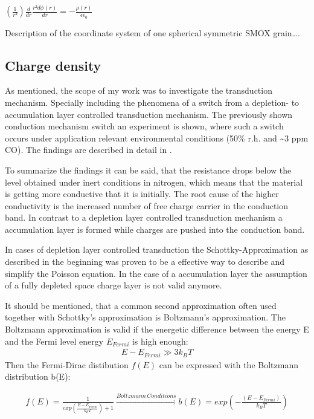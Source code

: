\documentclass[11pt]{article}
\begin{document}
\((\frac{1}{r²})\frac{d}{dr}\frac{r²d\phi(r)}{dr}=-\frac{\rho(r)}{\epsilon\epsilon_{0}}\)

Description of the coordinate system of one spherical symmetric SMOX
grain\ldots.

    \hypertarget{charge-density}{%
\subsection{Charge density}\label{charge-density}}

As mentioned, the scope of my work was to investigate the transduction
mechanism. Specially including the phenomena of a switch from a
depletion- to accumulation layer controlled transduction mechanism. The
previously shown conduction mechanism switch an experiment is shown,
where such a switch occurs under application relevant environmental
conditions (50\% r.h. and \textasciitilde3 ppm CO). The findings are
described in detail in \cite{Barsan2015}.

To summarize the findings it can be said, that the resistance drops
below the level obtained under inert conditions in nitrogen, which means
that the material is getting more conductive that it is initially. The
root cause of the higher conductivity is the increased number of free
charge carrier in the conduction band. In contrast to a depletion layer
controlled transduction mechanism a accumulation layer is formed while
charges are pushed into the conduction band.

In cases of depletion layer controlled transduction the
Schottky-Approximation as described in the beginning was proven to be a
effective way to describe and simplify the Poisson equation. In the case
of a accumulation layer the assumption of a fully depleted space charge
layer is not valid anymore.

It should be mentioned, that a common second approximation often used
together with Schottky's approximation is Boltzmann's approximation. The
Boltzmann approximation is valid if the energetic difference between the
energy E and the Fermi level energy \(E_{Fermi}\) is high enough:
\begin{align}
E-E_{Fermi}\gg3k_{B}T
\end{align} Then the Fermi-Dirac distibution \(f(E)\) can be expressed
with the Boltzmann distribution b(E):

\begin{align}
f(E)=\frac{1}{exp(\frac{E-E_{Fermi}}{k_{B}T})+1}\xrightarrow{Boltzmann\,Conditions}b(E)=exp(-\frac{(E-E_{Fermi})}{k_{B}T})
\end{align}
\end{document}
